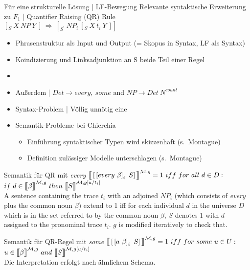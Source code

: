 \begin{frame}
  {Für eine strukturelle Lösung | LF-Bewegung}
  \onslide<+->
  \onslide<+->
  Relevante syntaktische Erweiterung zu $F_1$ | \alert{Quantifier Raising (QR) Rule}\\
  \Halbzeile
  \onslide<+->
  \centering 
  {\Large \alert{$[_S\ X\ NP\ Y\ ]\ \Longrightarrow\ [_{S^{\prime}}\ NP_i\ [_S\ X\ t_i\ Y\ ]]$}}\\
  \Halbzeile
  \begin{itemize}[<+->]
    \item Phrasenstruktur als Input und Output (= Skopus in Syntax, LF als Syntax)
    \item Koindizierung und Linksadjunktion an S beide Teil einer Regel
    \item {}
      \Halbzeile
    \item Außerdem | \alert{$Det \rightarrow every,\ some$} and \alert{$NP \rightarrow Det\ N^{count}$}
      \Halbzeile
    \item Syntax-Problem | Völlig unnötig eine 
    \item Semantik-Probleme bei Chierchia
      \begin{itemize}[<+->]
        \item Einführung syntaktischer Typen wird skizzenhaft (s.\ Montague)
        \item Definition zulässiger Modelle unterschlagen (s.\ Montague)
      \end{itemize}
  \end{itemize}
\end{frame}

\begin{frame}
  {Semantik für QR mit \textit{every}}
  \onslide<+->
  \onslide<+->
  \centering
  \alert{\Large $\Dem{\ekm{\ekm{every\ \beta}_i\ S}}{\mMm,g}=1\ iff\ for\ all\ d\in D:$\\
  $if\ d\in\Dem{\beta}{\mMm,g}\ then\ \Dem{S}{\mMm,g\ekm{u/t_i}}$}\\
  \onslide<+->
  \Zeile
  A sentence containing the trace $t_i$ with an adjoined $NP_i$ (which consists of \emph{every} plus the common noun $\beta$) extend to 1 iff for each individual $d$ in the universe $D$ which is in the set referred to by the common noun $\beta$, $S$ denotes 1 with $d$ assigned to the pronominal trace $t_i$. $g$ is modified iteratively to check that.
\end{frame}


\begin{frame}
  {Semantik für QR-Regel mit \textit{some}}
  \onslide<+->
  \onslide<+->
  \centering
  \alert{\Large $\Dem{\ekm{\ekm{a\ \beta}_i\ S}}{\mMm,g}=1\ iff\ for\ some\ u\in U:$\\
    $u\in\Dem{\beta}{\mMm,g}\ and\ \Dem{S}{\mMm,g\ekm{u/t_i}}$}\\
  \onslide<+->
  \Zeile
  Die Interpretation erfolgt nach ähnlichem Schema.
\end{frame}

